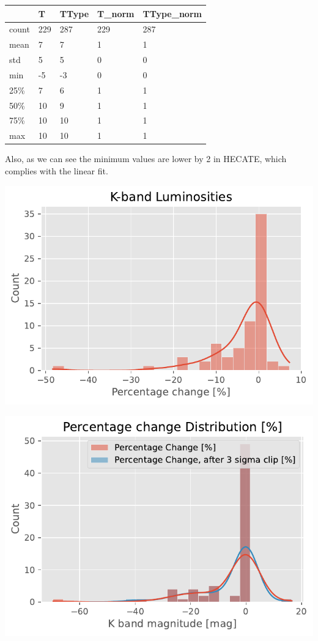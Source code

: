 \documentclass[
]{article}
\begin{document}
\begin{longtable}[]{@{}lllll@{}}
\toprule\noalign{}
& T & TType & T\_norm & TType\_norm \\
\midrule\noalign{}
\endhead
\bottomrule\noalign{}
\endlastfoot
count & 229 & 287 & 229 & 287 \\
mean & 7 & 7 & 1 & 1 \\
std & 5 & 5 & 0 & 0 \\
min & -5 & -3 & 0 & 0 \\
25\% & 7 & 6 & 1 & 1 \\
50\% & 10 & 9 & 1 & 1 \\
75\% & 10 & 10 & 1 & 1 \\
max & 10 & 10 & 1 & 1 \\
\end{longtable}

Also, as we can see the minimum values are lower by 2 in HECATE, which
complies with the linear fit.

\includegraphics{compare_files/figure-pdf/cell-25-output-1.pdf}

\includegraphics{compare_files/figure-pdf/cell-26-output-1.pdf}
\end{document}
